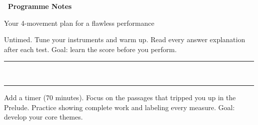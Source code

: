 
\thispagestyle{empty}

{
\sffamily

\begin{center}
    \textcolor{musBlack}{\fontsize{26}{30}\selectfont\bfseries
    \faMusic~Programme Notes~\faMusic}

    \smallskip
    \textcolor{musSilver}{\normalsize Your 4-movement plan for a flawless performance}
\end{center}

\vspace{2mm}

\noindent
\begin{tcolorbox}[
    enhanced,
    colback=musGold!5,
    colframe=musGold!45,
    arc=4pt, boxrule=1.5pt,
    left=5mm, right=5mm, top=3mm, bottom=3mm,
    title={\textcolor{white}{Movement I: Prelude (Tests 1--3)}},
    colbacktitle=musGold!70,
    fonttitle=\bfseries\sffamily,
    borderline west={3pt}{0pt}{musGold!55},
]
    \small
    Untimed. Tune your instruments and warm up.
    Read every answer explanation after each test.
    Goal: learn the score before you perform.
\end{tcolorbox}

\vspace{1mm}
\begin{center}
    \textcolor{musGold!30}{\rule{0.3\linewidth}{0.4pt}}
    \textcolor{musGold!50}{~\faAngleDoubleDown~}
    \textcolor{musGold!30}{\rule{0.3\linewidth}{0.4pt}}
\end{center}
\vspace{1mm}

\noindent
\begin{tcolorbox}[
    enhanced,
    colback=musBurgundy!5,
    colframe=musBurgundy!40,
    arc=4pt, boxrule=1.5pt,
    left=5mm, right=5mm, top=3mm, bottom=3mm,
    title={\textcolor{white}{Movement II: Development (Tests 4--6)}},
    colbacktitle=musBurgundy!70,
    fonttitle=\bfseries\sffamily,
    borderline west={3pt}{0pt}{musBurgundy!55},
]
    \small
    Add a timer (70 minutes). Focus on the passages that
    tripped you up in the Prelude. Practice showing complete
    work and labeling every measure.
    Goal: develop your core themes.
\end{tcolorbox}

}
